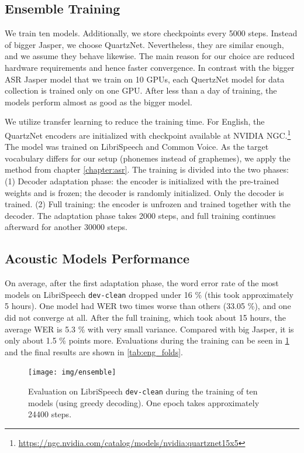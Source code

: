 \subsection{Ensemble Training}
We train ten models. Additionally, we store checkpoints every 5000 steps. Instead of bigger Jasper, we choose QuartzNet. Nevertheless, they are similar enough, and we assume they behave likewise. The main reason for our choice are reduced hardware requirements and hence faster convergence. In contrast with the bigger ASR Jasper model that we train on 10 GPUs, each QuertzNet model for data collection is trained only on one GPU. After less than a day of training, the models perform almost as good as the bigger model.

We utilize transfer learning to reduce the training time. For English, the QuartzNet encoders are initialized with checkpoint available at NVIDIA NGC.\footnote{\url{https://ngc.nvidia.com/catalog/models/nvidia:quartznet15x5}} The model was trained on LibriSpeech and Common Voice. As the target vocabulary differs for our setup (phonemes instead of graphemes), we apply the method from chapter \ref{chapter:asr}. The training is divided into the two phases: (1) Decoder adaptation phase: the encoder is initialized with the pre-trained weights and is frozen; the decoder is randomly initialized. Only the decoder is trained. (2) Full training: the encoder is unfrozen and trained together with the decoder. The adaptation phase takes 2000 steps, and full training continues afterward for another 30000 steps.

\subsection{Acoustic Models Performance}
On average, after the first adaptation phase, the word error rate of the most models on LibriSpeech \texttt{dev-clean} dropped under 16 \% (this took approximately 5 hours). One model had WER two times worse than others (33.05 \%), and one did not converge at all. After the full training, which took about 15 hours, the average WER is 5.3 \% with very small variance. Compared with big Jasper, it is only about 1.5 \% points more. Evaluations during the training can be seen in \cref{fig:ensemble_training} and the final results are shown in \cref{tab:eng_folds}.

\begin{figure}[t]
	\texttt{[image: img/ensemble]}
	\caption{Evaluation on LibriSpeech \texttt{dev-clean} during the training of ten models (using greedy decoding). One epoch takes approximately 24400 steps.}
	\label{fig:ensemble_training}
\end{figure}

